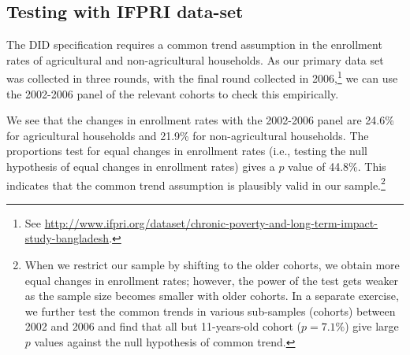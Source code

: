 \documentclass[12pt,letterpaper]{article}\usepackage[margin=1in]{geometry}
\newcommand{\0}{\ensuremath{\mbox{\boldmath $0$}}}
\begin{document}
\subsection{Testing with IFPRI data-set}

The DID specification requires a common trend assumption in the enrollment rates of agricultural and non-agricultural households. As our primary data set was collected in three rounds, with the final round collected in 2006,\footnote{See \url{http://www.ifpri.org/dataset/chronic-poverty-and-long-term-impact-study-bangladesh}.} we can use the 2002-2006 panel of the relevant cohorts to check this empirically. 


We see that the changes in enrollment rates with the 2002-2006 panel are 24.6\% for agricultural households and 21.9\% for non-agricultural households. The proportions test for equal changes in enrollment rates (i.e., testing the null hypothesis of equal changes in enrollment rates) gives a $p$ value of 44.8\%.
This indicates that the common trend assumption is plausibly valid in our sample.\footnote{When we restrict our sample by shifting to the older cohorts, we obtain more equal changes in enrollment rates; however, the power of the test gets weaker as the sample size becomes smaller with older cohorts. In a separate exercise, we further test the common trends in various sub-samples (cohorts) between 2002 and 2006 and find that all but 11-years-old cohort ($p=7.1\%$) give large $p$ values against the null hypothesis of common trend.}

\end{document}
